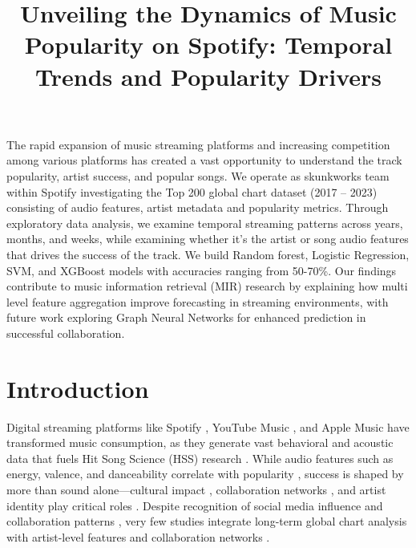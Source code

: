 \documentclass{article}
\title{Unveiling the Dynamics of Music Popularity on Spotify:
 Temporal Trends and Popularity Drivers}
\renewenvironment{abstract}
  {\small
   \begin{center}
   \bfseries \abstractname\vspace{-.5em}\vspace{0pt}
   \end{center}
   \list{}{%
     \setlength{\leftmargin}{0.5cm}%
     \setlength{\rightmargin}{\leftmargin}%
   }%
   \item\relax}
  {\endlist}
\begin{document}
\maketitle


\begin{abstract}
The rapid expansion of music streaming platforms and increasing competition among various platforms  has created a vast opportunity to understand the track popularity, artist success, and popular songs. We operate as skunkworks team within Spotify investigating the Top 200 global chart dataset (2017 – 2023) consisting of audio features, artist metadata and popularity metrics. Through exploratory data analysis, we examine temporal streaming patterns across years, months, and weeks, while examining whether it's the artist or song audio features that drives the success of the track. We build Random forest, Logistic Regression, SVM, and XGBoost models with accuracies ranging from 50-70\%. Our findings contribute to music information retrieval (MIR) research by explaining how multi level feature aggregation improve forecasting in streaming environments, with future work exploring Graph Neural Networks for enhanced prediction in successful collaboration.
\end{abstract}

\vspace{-0.3cm} %

\section{Introduction}

Digital streaming platforms like Spotify \cite{Spotify}, YouTube Music \cite{YouTubeMusicPlatform}, and Apple Music \cite{AppleMusic} have transformed music consumption, as they generate vast behavioral and acoustic data that fuels Hit Song Science (HSS) research \cite{schedl2016, oord2013}. While audio features such as energy, valence, and danceability correlate with popularity \cite{kim2020, pachet2008}, success is shaped by more than sound alone—cultural impact \cite{salganik2006}, collaboration networks \cite{herd2022, oliveira2020detecting}, and artist identity play critical roles \cite{macia2023}. Despite recognition of social media influence \cite{salganik2006} and collaboration patterns \cite{oliveira2020detecting}, very few studies integrate long-term global chart analysis with artist-level features and collaboration networks \cite{macia2023}.
\end{document}
